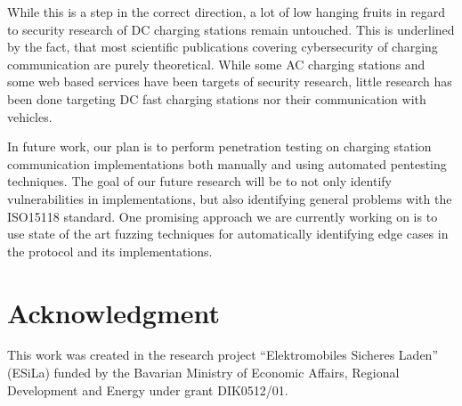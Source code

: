 \documentclass[conference,flushend]{iaria} %
\begin{document}
While this is a step in the correct direction, a lot of low hanging fruits in regard to security research of DC charging stations remain untouched.
This is underlined by the fact, that most scientific publications covering cybersecurity of charging communication are purely theoretical.
While some AC charging stations and some web based services have been targets of security research, little research has been done targeting DC fast charging stations nor their communication with vehicles.

In future work, our plan is to perform penetration testing on charging station communication implementations both manually and using automated pentesting techniques.
The goal of our future research will be to not only identify vulnerabilities in implementations, but also identifying general problems with the ISO15118 standard.
One promising approach we are currently working on is to use state of the art fuzzing techniques for automatically identifying edge cases in the protocol and its implementations.

\section*{Acknowledgment}
This work was created in the research project \enquote{Elektromobiles Sicheres Laden} (ESiLa) funded by the Bavarian Ministry of Economic Affairs, Regional Development and Energy under grant DIK0512/01.

\printbibliography
\end{document}
